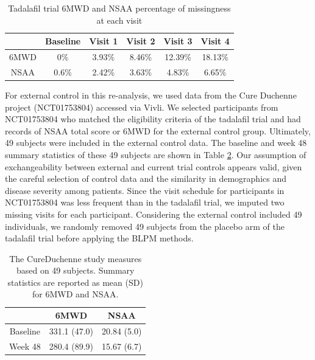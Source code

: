 \begin{table}
\caption{Tadalafil trial 6MWD and NSAA percentage of missingness at each visit \label{tab:missingness}}
\begin{center}
\begin{tabular}{cccccc}
  &  Baseline &  Visit 1 & Visit 2 & Visit 3 & Visit 4 \tabularnewline
\hline
6MWD & 0\% & 3.93\% & 8.46\% & 12.39\% & 18.13\% \\
NSAA & 0.6\% & 2.42\% & 3.63\% & 4.83\% & 6.65\%  \\
\hline
\end{tabular}
\end{center}
\end{table}

For external control in this re-analysis, we used data from the Cure Duchenne project (NCT01753804) accessed via Vivli. We selected participants from NCT01753804 who matched the eligibility criteria of the tadalafil trial and had records of \ac{NSAA} total score or \ac{6MWD} for the external control group. Ultimately, 49 subjects were included in the external control data. The baseline and week 48 summary statistics of these 49 subjects are shown in Table \ref{tab:cureduchenne}. Our assumption of exchangeability between external and current trial controls appears valid, given the careful selection of control data and the similarity in demographics and disease severity among patients. Since the visit schedule for participants in NCT01753804 was less frequent than in the tadalafil trial, we imputed two missing visits for each participant. Considering the external control included 49 individuals, we randomly removed 49 subjects from the placebo arm of the tadalafil trial before applying the \ac{BLPM} methods.

\begin{table}
\caption{The CureDuchenne study measures based on 49 subjects. Summary
statistics are reported as mean (SD) for 6MWD and NSAA.\label{tab:cureduchenne}}
\vspace{-2.5mm}
\begin{center}
\begin{tabular}{ccc}
& 6MWD & NSAA \\
\hline
Baseline & 331.1 (47.0) &  20.84 (5.0)\\
Week 48 & 280.4 (89.9) & 15.67 (6.7)\\
\hline
\end{tabular}
\end{center}
\end{table}

